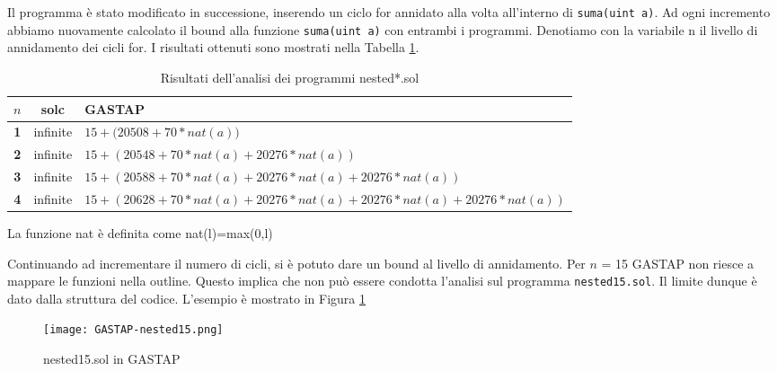     
    Il programma è stato modificato in successione, inserendo un ciclo for annidato alla volta all'interno di \verb|suma(uint a)|. Ad ogni incremento abbiamo nuovamente calcolato il bound alla funzione \verb|suma(uint a)| con entrambi i programmi. Denotiamo con la variabile n il livello di annidamento dei cicli for. I risultati ottenuti sono mostrati nella Tabella \ref{tab:nested-outputs}.
    
    \begin{table}[h]
    \begin{threeparttable}[b]
     


     \begin{center}
        \caption[legenda elenco tabelle]{Risultati dell'analisi dei programmi nested*.sol}\label{tab:nested-outputs}
        \begin{tabular}{ccp{12cm}}  
        \hline \hline   %
        $n$ & solc & GASTAP \\   %
        \hline  %
        \bf1 & infinite & $15 + (20508+70*nat$\tnote{1}$(a))$\\
        \bf2 & infinite & $15 + (20548+70*nat(a)+20276*nat(a))$\\
        \bf3 & infinite & $15 + (20588+70*nat(a)+20276*nat(a)+20276*nat(a))$\\
        \bf4 & infinite & $15 + (20628+70*nat(a)+20276*nat(a)+20276*nat(a)+20276*nat(a))$\\
        \end{tabular}
        \begin{tablenotes}
            \item [1] La funzione nat è definita come nat(l)=max(0,l)
        \end{tablenotes}
     \end{center}
    \end{threeparttable}
    \end{table}

    
    Continuando ad incrementare il numero di cicli, si è potuto dare un bound al livello di annidamento. Per $n$ = 15 GASTAP non riesce a mappare le funzioni nella outline. Questo implica che non può essere condotta l'analisi sul programma \verb|nested15.sol|. Il limite dunque è dato dalla struttura del codice. L'esempio è mostrato in Figura \ref{fig:gstp-nested15}\newline
    
    \begin{figure}[h]
        \centering
        \texttt{[image: GASTAP-nested15.png]}
        \caption{nested15.sol in GASTAP}
        \label{fig:gstp-nested15}
    \end{figure}

